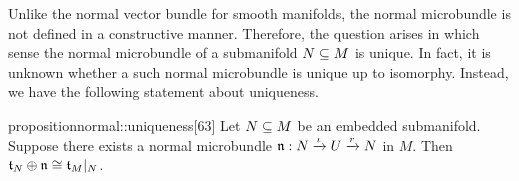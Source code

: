 \begin{myparagraph}
    Unlike the normal vector bundle for smooth manifolds,
    the normal microbundle is not defined in a constructive manner.
    Therefore, the question arises in which sense the normal microbundle
    of a submanifold $N \subseteq{} M$ is unique.
    In fact, it is unknown whether a such normal microbundle is unique up to isomorphy.
    Instead, we have the following statement about uniqueness.
\end{myparagraph}

\begin{mystatement}{proposition}{normal::uniqueness}[63]
    Let $N \subseteq{} M$ be an embedded submanifold.
    Suppose there exists a normal microbundle
    $\mathfrak{n}: N \xrightarrow{\iota} U \xrightarrow{r} N{}$ in $M$.
    Then $\mathfrak{t}_N \oplus \mathfrak{n} \cong \mathfrak{t}_M\vert_{N}$.
\end{mystatement}

